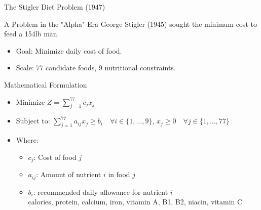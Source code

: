 \documentclass[presentation, aspectratio=169]{beamer}
\begin{document}
\begin{frame}[label={sec:org4fe396f}]{The Stigler Diet Problem (1947)}
\begin{block}{A Problem in the "Alpha" Era}
George Stigler (1945) sought the minimum cost to feed a 154lb man.
\begin{itemize}
\item \alert{\alert{Goal}}: Minimize daily cost of food.
\item \alert{\alert{Scale}}: 77 candidate foods, 9 nutritional constraints.
\end{itemize}
\end{block}

\begin{block}{Mathematical Formulation}
\begin{itemize}
\item Minimize \(Z = \sum_{j=1}^{77} c_j x_j\)

\item Subject to: \(\sum_{j=1}^{77} a_{ij} x_j \ge b_i \quad \forall i \in \{1, \dots, 9\}\), \qquad
\(x_j \ge 0 \quad \forall j \in \{1, \dots, 77\}\)

\item Where:
\begin{itemize}
\item \(c_j\): Cost of food \(j\)
\item \(a_{ij}\): Amount of nutrient \(i\) in food \(j\)
\item \(b_i\): recommended daily allowance for nutrient \(i\) \\
calories, protein, calcium, iron, vitamin A, B1, B2, niacin, vitamin C
\end{itemize}
\end{itemize}
\end{block}
\end{frame}
\end{document}
